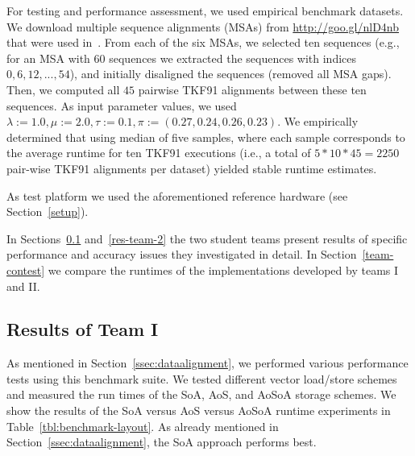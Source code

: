 \documentclass[runningheads,a4paper]{llncs}
\begin{document}

For testing and performance assessment, we used empirical benchmark datasets. We download multiple sequence alignments (MSAs) from \url{http://goo.gl/nlD4nb}
that were used in~\cite{bininda2005transalign}.
From each of the six MSAs, we selected ten sequences (e.g., for an MSA with $60$ sequences we extracted the sequences with indices $0, 6, 12, ..., 54$),
and initially disaligned the sequences (removed all MSA gaps).
Then, we computed all $45$ pairwise TKF91 alignments between
these ten sequences. As input parameter values, we used $\lambda:=1.0, \mu:=2.0, \tau:=0.1, \pi:=(0.27, 0.24, 0.26, 0.23)$.
We empirically determined that using median of five samples, where each sample corresponds to 
the average runtime for ten TKF91 executions (i.e., a total of $5*10*45 = 2250$ pair-wise TKF91 alignments per dataset)
yielded stable runtime estimates.


As test platform we used the aforementioned reference hardware (see Section~\ref{setup}).

In Sections~\ref{res-team-1} and~\ref{res-team-2} the two student teams present results of specific performance and accuracy issues they investigated in detail.
In Section~\ref{team-contest} we compare the runtimes of the implementations developed by teams I and II.

\subsection{Results of Team I}
\label{res-team-1}


As mentioned in Section~\ref{ssec:dataalignment}, we performed various performance tests using this benchmark suite.
We tested different vector load/store schemes and measured the run times of the SoA, AoS, and AoSoA storage schemes.
We show the results of the SoA versus AoS versus AoSoA runtime experiments in Table~\ref{tbl:benchmark-layout}.
As already mentioned in Section~\ref{ssec:dataalignment}, the SoA approach performs best.
\end{document}
